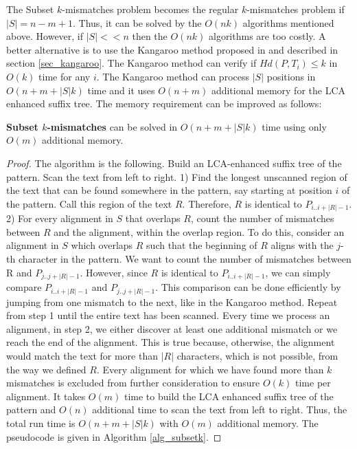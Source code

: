 The Subset $k$-mismatches problem becomes the regular $k$-mismatches
problem if $|S|=n-m+1$. Thus, it can be solved by the $O(nk)$ algorithms mentioned
above. However, if $|S| << n$ then the
$O(nk)$ algorithms are too costly.
A better alternative is to use the Kangaroo method proposed in \cite{ALP04} and
described in section \ref{sec_kangaroo}. The Kangaroo method can verify if
$Hd(P, T_i)\leq k$ in $O(k)$ time for any $i$. The
Kangaroo method can process $|S|$ positions in $O(n+m+|S|k)$ time and it
uses $O(n+m)$ additional memory for the LCA enhanced suffix tree.
The memory requirement can be improved as follows:

\begin{theorem}
{\bf Subset $k$-mismatches} can be solved in $O(n+m+|S|k)$ time using only
$O(m)$ additional memory.
\end{theorem}


\begin{proof}
The algorithm  is the following. Build an LCA-enhanced suffix tree
 of the pattern. Scan the text from left to right. 1) Find the longest unscanned region
of the text that can be found somewhere in the pattern, say starting at
position $i$ of the pattern. Call this region of the text $R$. Therefore, $R$ is
identical to $P_{i..i+|R|-1}$. 2) For every alignment in $S$ that overlaps $R$, count
the number of mismatches between $R$ and the alignment, within the overlap
region.
To do this, consider an alignment in $S$ which overlaps $R$ such that the
beginning of $R$ aligns with the $j$-th character in the pattern. We want to count the number of mismatches between R and $P_{j..j+|R|-1}$. However, since $R$ is identical to
$P_{i..i+|R|-1}$, we can simply compare $P_{i..i+|R|-1}$ and
$P_{j..j+|R|-1}$. This comparison can be done efficiently by jumping from one
mismatch to the next, like in the Kangaroo method. Repeat from step 1 until the
entire text has been scanned.
Every time we process an alignment, in step 2, we either discover at least one additional
mismatch or we reach the end of the alignment.
This is true because, otherwise, the alignment
would match the text for more than $|R|$ characters, which is not possible, from
the way we defined $R$. Every alignment for which we have found more than $k$
mismatches is excluded from further consideration to ensure
$O(k)$ time per alignment. It takes $O(m)$ time to build the LCA enhanced suffix tree of the pattern and
$O(n)$ additional time to scan the text from left to right. Thus, the total run time is
$O(n+m+|S|k)$ with $O(m)$ additional memory. The pseudocode is given in
Algorithm \ref{alg_subsetk}.
\end{proof}

